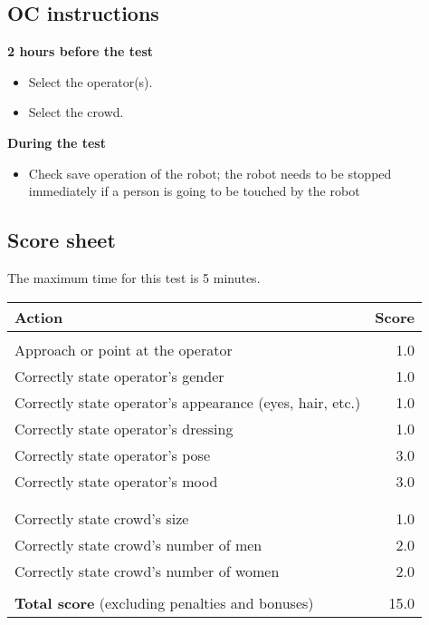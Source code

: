 %

\subsection{OC instructions}

\textbf{2 hours before the test}
\begin{itemize}
\item Select the  operator(s).
\item Select the crowd.
\end{itemize}

\textbf{During the test}
\begin{itemize}
\item Check save operation of the robot; the robot needs to be stopped immediately if a person is going to be touched by the robot
\end{itemize}

\subsection{Score sheet}
The maximum time for this test is 5 minutes.

\begin{tabularx}{\textwidth}{ X r }
	\textbf{Action} & \textbf{Score} \\ \hline
	\textbi{Operator}  \\
	Approach or point at the operator & 1.0 \\
	Correctly state operator's gender & 1.0 \\
	Correctly state operator's appearance (eyes, hair, etc.) & 1.0 \\
	Correctly state operator's dressing & 1.0 \\
	Correctly state operator's pose & 3.0 \\
	Correctly state operator's mood & 3.0 \\
	\\
	\textbi{Crowd} \\
	Correctly state crowd's size & 1.0 \\
	Correctly state crowd's number of men & 2.0 \\
	Correctly state crowd's number of women & 2.0 \\
	\\ \hline
	\textbf{Total score} (excluding penalties and bonuses) & 15.0 \\
\end{tabularx}